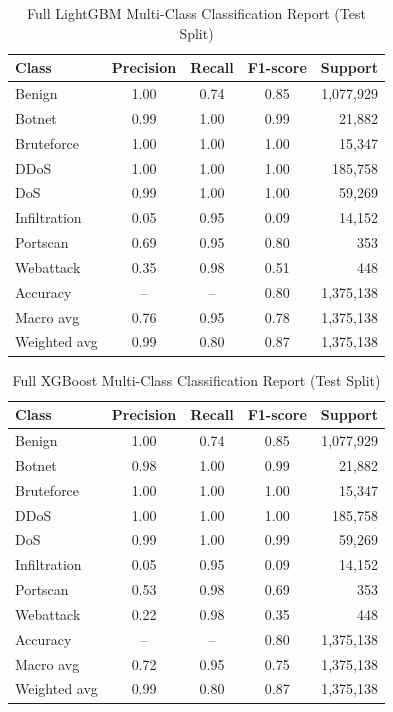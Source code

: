 \documentclass[10pt,journal]{IEEEtran}
\begin{document}
\begin{table}[!t]
\caption{Full LightGBM Multi-Class Classification Report (Test Split)}
\label{tab:lgb_full_report}
\centering
\begin{tabular}{l c c c r}
\toprule
Class & Precision & Recall & F1-score & Support \\
\midrule
Benign & 1.00 & 0.74 & 0.85 & 1,077,929 \\
Botnet & 0.99 & 1.00 & 0.99 & 21,882 \\
Bruteforce & 1.00 & 1.00 & 1.00 & 15,347 \\
DDoS & 1.00 & 1.00 & 1.00 & 185,758 \\
DoS & 0.99 & 1.00 & 1.00 & 59,269 \\
Infiltration & 0.05 & 0.95 & 0.09 & 14,152 \\
Portscan & 0.69 & 0.95 & 0.80 & 353 \\
Webattack & 0.35 & 0.98 & 0.51 & 448 \\
\midrule
Accuracy & -- & -- & 0.80 & 1,375,138 \\
Macro avg & 0.76 & 0.95 & 0.78 & 1,375,138 \\
Weighted avg & 0.99 & 0.80 & 0.87 & 1,375,138 \\
\bottomrule
\end{tabular}
\end{table}

\begin{table}[!t]
\caption{Full XGBoost Multi-Class Classification Report (Test Split)}
\label{tab:xgb_full_report}
\centering
\begin{tabular}{l c c c r}
\toprule
Class & Precision & Recall & F1-score & Support \\
\midrule
Benign & 1.00 & 0.74 & 0.85 & 1,077,929 \\
Botnet & 0.98 & 1.00 & 0.99 & 21,882 \\
Bruteforce & 1.00 & 1.00 & 1.00 & 15,347 \\
DDoS & 1.00 & 1.00 & 1.00 & 185,758 \\
DoS & 0.99 & 1.00 & 0.99 & 59,269 \\
Infiltration & 0.05 & 0.95 & 0.09 & 14,152 \\
Portscan & 0.53 & 0.98 & 0.69 & 353 \\
Webattack & 0.22 & 0.98 & 0.35 & 448 \\
\midrule
Accuracy & -- & -- & 0.80 & 1,375,138 \\
Macro avg & 0.72 & 0.95 & 0.75 & 1,375,138 \\
Weighted avg & 0.99 & 0.80 & 0.87 & 1,375,138 \\
\bottomrule
\end{tabular}
\end{table}
\end{document}
